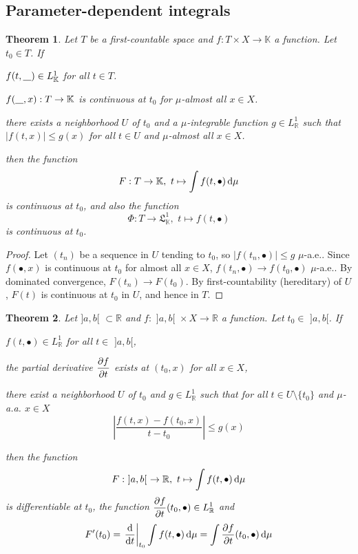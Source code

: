 \documentclass[11pt, a4paper, openany]{book}
\newtheorem{thm}{Theorem}\newtheorem{lem}{Lemma}\newtheorem{crl}{Corollary}
\theoremstyle{definition}
\newcommand{\ph}{\underline{\hspace{0.3cm}}}
\newenvironment{tight_enumerate}{\begin{enumerate}\itemsep -0.2em}{\end{enumerate}}
\begin{document}
\subsection{Parameter-dependent integrals}
    \begin{thm}\label{continuity of parameter-dependent integral}
        Let $T$ be a first-countable space and $f:T\times X\rightarrow \mathbb{K}$ a function. Let $t_0\in T$. If
        \begin{tight_enumerate}
            \item $f(t,\ph)\in L^1_{\mathbb{K}}$ for all $t\in T$.
            \item $f(\ph,x):T\rightarrow \mathbb{K}$ is continuous at $t_0$ for $\mu$-almost all $x\in X$.
            \item there exists a neighborhood $U$ of $t_0$ and a $\mu$-integrable function $g\in L^1_\mathbb{R}$ such that $|f(t,x)|\leqslant g(x)$ for all $t\in U$ and $\mu$-almost all $x\in X$.
        \end{tight_enumerate}
        then the function
        \[
            F:T\rightarrow \mathbb{K},\,\,t\mapsto \int f(t,\bullet )\odif \mu
        \]
        is continuous at $t_0$, and also the function
        \[
            \Phi:T\rightarrow \mathfrak{L}^1_{\mathbb{K}},\,\,t\mapsto f(t,\bullet)
        \]
        is continuous at $t_0$.
    \end{thm}
    \begin{proof}
        Let $(t_n)$ be a sequence in $U$ tending to $t_0$, so $|f(t_n,\bullet)|\leqslant g$ $\mu$-a.e.. Since $f(\bullet,x)$ is continuous at $t_0$ for almost all $x\in X$, $f(t_n,\bullet)\to f(t_0,\bullet)$ $\mu$-a.e.. By dominated convergence, $F(t_n)\to F(t_0)$. By first-countability (hereditary) of $U$, $F(t)$ is continuous at $t_0$ in $U$, and hence in $T$.
    \end{proof}
    \begin{thm}\label{differentiability of parameter-dependent integral}
        Let $]a,b[\,\,\subset\mathbb{R}$ and $f:\,\,]a,b[\,\,\times X\rightarrow\mathbb{R}$ a function. Let $t_0\in\,\,]a,b[$. If
        \begin{tight_enumerate}
            \item $f(t,\bullet)\in L^1_\mathbb{R}$ for all $t\in \,\,]a,b[$,
            \item the partial derivative $\displaystyle \pdv{f}{t}$ exists at $(t_0,x)$ for all $x\in X$,
            \item there exist a neighborhood $U$ of $t_0$ and $g\in L^1_\mathbb{R}$ such that for all $t\in U\setminus\{t_0\}$ and $\mu$-a.a. $x\in X$
            \[
                \left|\frac{f(t,x)-f(t_0,x)}{t-t_0}\right|\leqslant g(x)
            \]
        \end{tight_enumerate}
        then the function
        \[F:\,\,]a,b[\,\,\rightarrow \mathbb{R},\,\,t\mapsto \int f(t,\bullet)\odif\mu\]
        is differentiable at $t_0$, the function $\displaystyle \pdv{f}{t}(t_0,\bullet)\in L^1_\mathbb{R}$ and
        \[
            F'(t_0)=\odv{}{t}_{t_0}\int f(t,\bullet)\odif\mu=\int \pdv{f}{t}(t_0,\bullet)\odif\mu
        \]
    \end{thm}
\end{document}
